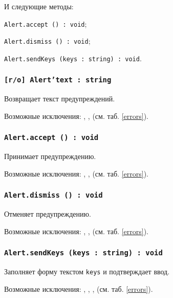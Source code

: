 И следующие методы:
\begin{icItems}
	\item \texttt{Alert.accept () : void};
	\item \texttt{Alert.dismiss () : void};
	\item \texttt{Alert.sendKeys (keys : string) : void}.
\end{icItems}

\subsubsection{\texttt{[r/o] Alert'text : string}}

Возвращает текст предупреждений.

Возможные исключения: , ,  (см. таб. \ref{errors}).

\subsubsection{\texttt{Alert.accept () : void}}

Принимает предупреждению.

Возможные исключения: , ,  (см. таб. \ref{errors}).

\subsubsection{\texttt{Alert.dismiss () : void}}

Отменяет предупреждению.

Возможные исключения: , ,  (см. таб. \ref{errors}).

\subsubsection{\texttt{Alert.sendKeys (keys : string) : void}}

Заполняет форму текстом \texttt{keys} и подтверждает ввод.

Возможные исключения: , , ,  (см. таб. \ref{errors}).


